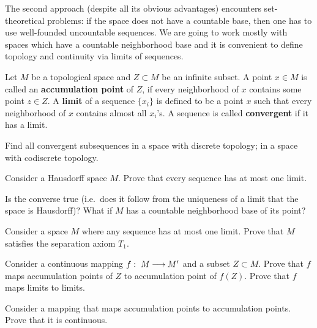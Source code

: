 \documentclass[12pt]{article}
\begin{document}
The second approach (despite all its obvious advantages) encounters
set-theoretical problems: if the space does not have a countable base,
then one has to use well-founded uncountable sequences. We are going
to work mostly with spaces which have a countable neighborhood base
and it is convenient to define topology and continuity via limits of
sequences.

\begin{opredelenie} 
  Let $M$ be a topological space and $Z\subset M$ be an infinite
  subset.  A point $x\in M$ is called an {\bf accumulation point} of
  $Z$, if every neighborhood of $x$ contains some point $z\in
  Z$. A {\bf limit } of a sequence $\{ x_i\}$ is defined to be a point
  $x$ such that every neighborhood of $x$ contains almost all $x_i$'s.
  A sequence is called {\bf convergent} if it has a limit.
\end{opredelenie}

\begin{zadacha}
Find all convergent subsequences in a space with discrete topology; in
a space with codiscrete topology.
\end{zadacha}

\begin{zadacha}
Consider a Hausdorff space $M$. Prove that every sequence has at most
one limit.
\end{zadacha}

\begin{zadacha}[*]
Is the converse true (i.e.\ does it follow from the uniqueness of a
limit that the space is Hausdorff)?  What if $M$ has a countable
neighborhood base of its point?  
\end{zadacha}

\begin{zadacha} 
  Consider a space $M$  where any sequence has at most one limit.
  Prove that $M$ satisfies the separation axiom $T_1$.
\end{zadacha}

\begin{zadacha}
  Consider a continuous mapping $f:\; M {\:\longrightarrow\:} M'$ and a subset
  $Z\subset M$. Prove that $f$ maps accumulation points of $Z$ to
  accumulation point of $f(Z)$.  Prove that $f$ maps limits to
  limits. 
\end{zadacha}

\begin{zadacha}[!]
Consider a mapping that maps accumulation points to accumulation
points. Prove that it is continuous.
\end{zadacha}
\end{document}
